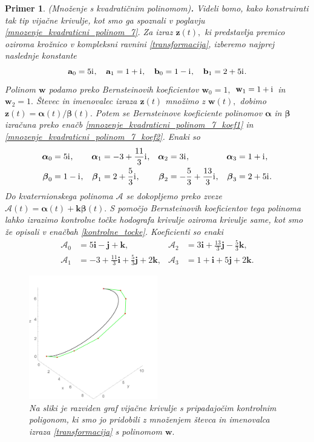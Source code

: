 \documentclass[12pt,a4paper,twoside]{article}
\newcommand{\iu}{\mathrm{i}\mkern1mu} %
\theoremstyle{definition} %
\theoremstyle{plain} %
\theoremstyle{primerstyle}
\newtheorem{primer}[definicija]{Primer}
\numberwithin{equation}{section}  %
\newcommand{\aV}{\mathbf{a}}
\newcommand{\bV}{\mathbf{b}}
\newcommand{\iV}{\mathbf{i}}
\newcommand{\jV}{\mathbf{j}}
\newcommand{\kV}{\mathbf{k}}
\newcommand{\wV}{\mathbf{w}}
\newcommand{\zV}{\mathbf{z}}
\newcommand{\AQ}{\mathcal{A}}
\newcommand{\balpha}{\boldsymbol \alpha}
\newcommand{\bbeta}{\boldsymbol \beta}
\begin{document}
\begin{primer}
	\textnormal{ }(Množenje s kvadratičnim polinomom)\textbf{.}
	Videli bomo, kako konstruirati tak tip vijačne krivulje, kot smo ga spoznali v poglavju \ref{mnozenje_kvadraticni_polinom_7}. Za izraz $\zV(t),$ ki predstavlja premico oziroma krožnico v kompleksni ravnini \eqref{transformacija}, izberemo najprej naslednje konstante
	\begin{equation*}
		\aV_0=5\iu,\quad\aV_1=1+\iu,\quad\bV_0=1-\iu,\quad\bV_1=2+5\iu.
	\end{equation*}
	Polinom $\wV$ podamo preko Bernsteinovih koeficientov $\wV_0=1,$ $\wV_1=1+\iu$ in $\wV_2=1.$ Števec in imenovalec izraza $\zV(t)$ množimo z $\wV(t),$ dobimo $\zV(t)=\balpha(t)/\bbeta(t).$ Potem se Bernsteinove koeficiente polinomov $\balpha$ in $\bbeta$ izračuna preko enačb \eqref{mnozenje_kvadraticni_polinom_7_koef1} in \eqref{mnozenje_kvadraticni_polinom_7_koef2}. Enaki so
	\begin{align*}
		\balpha_0&=5\iu,&\balpha_1&=-3+\frac{11}{3}\iu,&\balpha_2&=3\iu,&\balpha_3&=1+\iu,\\
		\bbeta_0&=1-\iu,&\bbeta_1&=2+\frac{5}{3}\iu,&\bbeta_2&=-\frac{5}{3}+\frac{13}{3}\iu,&\bbeta_3&=2+5\iu.
	\end{align*}
	Do kvaternionskega polinoma $\AQ$ se dokopljemo preko zveze $\AQ(t)=\balpha(t)+\kV\bbeta(t).$ S pomočjo Bernsteinovih koeficientov tega polinoma lahko izrazimo kontrolne točke hodografa krivulje oziroma krivulje same, kot smo že opisali v enačbah \eqref{kontrolne_tocke}. Koeficienti so enaki
	\begin{align*}
		\AQ_0&=5\iV-\jV+\kV,&\AQ_2&=3\iV+\frac{13}{3}\jV-\frac{5}{3}\kV,\\
		\AQ_1&=-3+\frac{11}{3}\iV+\frac{5}{3}\jV+2\kV,&\AQ_3&=1+\iV+5\jV+2\kV.
	\end{align*}
	\begin{figure}[h!]
	  \centering
	  \includegraphics[width=0.5\textwidth]{images/quat_poly_multi.pdf}
	  \caption[Primer vijačne krivulje, pridobljene s postopkom množenja z linearnim polinomom]{Na sliki je razviden graf vijačne krivulje s pripadajočim kontrolnim poligonom, ki smo jo pridobili z množenjem števca in imenovalca izraza \eqref{transformacija} s polinomom $\wV.$}
	  \label{fig:quat_poly_multi}
	\end{figure}
	

\end{primer}
\end{document}

